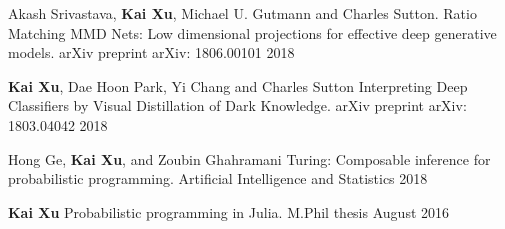 


\begin{cvpublications}

  \cvpublication
    {Akash Srivastava, \textbf{Kai Xu}, Michael U. Gutmann and Charles Sutton.} %
    {Ratio Matching MMD Nets: Low dimensional projections for effective deep generative models.} %
    {arXiv preprint arXiv: 1806.00101} %
    {2018} %

  \cvpublication
    {\textbf{Kai Xu}, Dae Hoon Park, Yi Chang and Charles Sutton} %
    {Interpreting Deep Classifiers by Visual Distillation of Dark Knowledge.} %
    {arXiv preprint arXiv: 1803.04042} %
    {2018} %

  \cvpublication
    {Hong Ge, \textbf{Kai Xu}, and Zoubin Ghahramani} %
    {Turing: Composable inference for probabilistic programming.} %
    {Artificial Intelligence and Statistics} %
    {2018} %

  \cvpublication
    {\textbf{Kai Xu}} %
    {Probabilistic programming in Julia.} %
    {M.Phil thesis} %
    {August 2016} %

\end{cvpublications}
